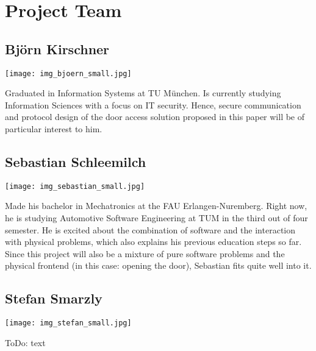 \section{Project Team}\label{sec:team}

\subsection{Björn Kirschner}
%
\begin{minipage}{0.2\textwidth}
\begin{flushleft}
	\texttt{[image: img\_bjoern\_small.jpg]}
\end{flushleft}
\end{minipage}
\hfill
\begin{minipage}{0.8\textwidth}
%
Graduated in Information Systems at TU München. Is currently studying Information Sciences with a focus on IT security. Hence, secure communication and protocol design of the door access solution proposed in this paper will be of particular interest to him.
%
\end{minipage}


\subsection{Sebastian Schleemilch}
%
\begin{minipage}{0.2\textwidth}
\begin{flushleft}
	\texttt{[image: img\_sebastian\_small.jpg]}
\end{flushleft}
\end{minipage}
\hfill
\begin{minipage}{0.8\textwidth}
%
Made his bachelor in Mechatronics at the FAU Erlangen-Nuremberg. Right now, he is studying Automotive Software Engineering at TUM in the third out of four semester. He is excited about the combination of software and the interaction with physical problems, which also explains his previous education steps so far.
Since this project will also be a mixture of pure software problems and the physical frontend (in this case: opening the door), Sebastian fits quite well into it.
%
\end{minipage}


\subsection{Stefan Smarzly}
%
\begin{minipage}{0.2\textwidth}
\begin{flushleft}
	\texttt{[image: img\_stefan\_small.jpg]}
\end{flushleft}
\end{minipage}
\hfill
\begin{minipage}{0.8\textwidth}
%
ToDo: text
%
\end{minipage}